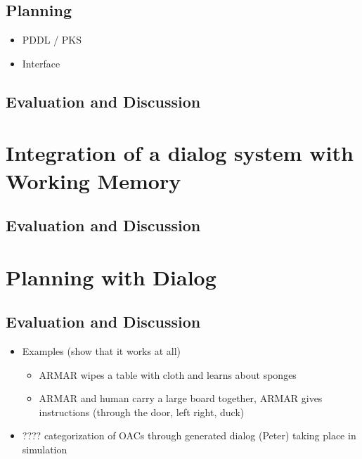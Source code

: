 \documentclass[english,ngerman]{KITreprt}
\begin{document}
\section{Planning}
\begin{itemize}
    \item PDDL / PKS
    \item Interface
\end{itemize}

\section{Evaluation and Discussion}


\chapter{Integration of a dialog system with Working Memory}

\section{Evaluation and Discussion}

\chapter{Planning with Dialog}

\section{Evaluation and Discussion}
\begin{itemize}
    \item Examples (show that it works at all)
        \begin{itemize}
            \item ARMAR wipes a table with cloth and learns about sponges
            \item ARMAR and human carry a large board together, ARMAR gives instructions
                (through the door, left right, duck)
        \end{itemize}
    \item ???? categorization of OACs through generated dialog (Peter) taking place in simulation
\end{itemize}
\end{document}
